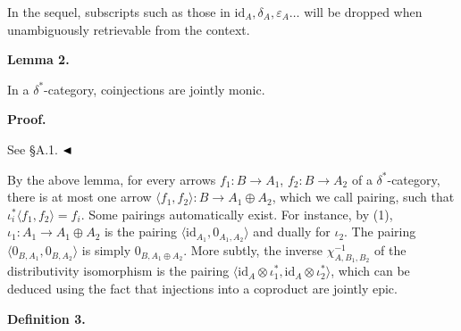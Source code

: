 \documentclass[10pt,a4paper]{amsart}
\begin{document}
In the sequel, subscripts such as those in $\mathrm{id}_{A},\delta_{A},\varepsilon_{A}\ldots$ will be dropped when unambiguously retrievable from the context.\par
 
 
 
\par\medskip\noindent\textbf{Lemma 2.}\par
 
 
In a $\delta^{\ast}$-category, coinjections are jointly monic.\par
 
 
 
 
\par\medskip\noindent\textbf{Proof.}\par
 
 
See §A.1. $\hfill\blacktriangleleft$\par
 
 
 
By the above lemma, for every arrows $f_{1}:B\to A_{1}$, $f_{2}:B\to A_{2}$ of a $\delta^{\ast}$-category, there is at most one arrow $\langle f_{1},f_{2}\rangle:B\to A_{1}\oplus A_{2}$, which we call pairing, such that $\iota^{\ast}_{i}\langle f_{1},f_{2}\rangle=f_{i}$. Some pairings automatically exist. For instance, by (1), $\iota_{1}:A_{1}\to A_{1}\oplus A_{2}$ is the pairing $\langle\mathrm{id}_{A_{1}},0_{A_{1},A_{2}}\rangle$ and dually for $\iota_{2}$. The pairing $\langle 0_{B,A_{1}},0_{B,A_{2}}\rangle$ is simply $0_{B,A_{1}\oplus A_{2}}$. More subtly, the inverse $\chi^{-1}_{A,B_{1},B_{2}}$ of the distributivity isomorphism is the pairing $\langle\mathrm{id}_{A}\otimes\iota^{*}_{1},\mathrm{id}_{A}\otimes\iota^{*}_{2}\rangle$, which can be deduced using the fact that injections into a coproduct are jointly epic.\par
 
 
 
\par\medskip\noindent\textbf{Definition 3.}\par
 
\end{document}
